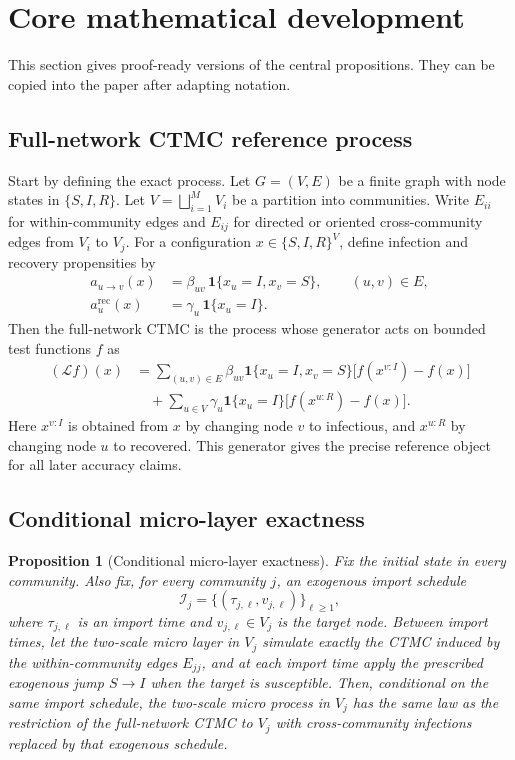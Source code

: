\documentclass[12pt,a4paper]{article}
\newtheorem{proposition}{Proposition}
\theoremstyle{definition}
\newcommand{\1}{\mathbf{1}}
\begin{document}
\section{Core mathematical development}

This section gives proof-ready versions of the central propositions.  They can be copied into the paper after adapting notation.

\subsection{Full-network CTMC reference process}

Start by defining the exact process.  Let $G=(V,E)$ be a finite graph with node states in $\{S,I,R\}$.  Let $V=\bigsqcup_{i=1}^M V_i$ be a partition into communities.  Write $E_{ii}$ for within-community edges and $E_{ij}$ for directed or oriented cross-community edges from $V_i$ to $V_j$.  For a configuration $x\in\{S,I,R\}^V$, define infection and recovery propensities by
\begin{align}
    a_{u\to v}(x) &= \beta_{uv}\,\1\{x_u=I,x_v=S\},\qquad (u,v)\in E,\\
    a_{u}^{\mathrm{rec}}(x) &= \gamma_u\,\1\{x_u=I\}.
\end{align}
Then the full-network CTMC is the process whose generator acts on bounded test functions $f$ as
\begin{align}
    (\mathcal L f)(x)
    &=\sum_{(u,v)\in E}\beta_{uv}\1\{x_u=I,x_v=S\}\bigl[f(x^{v:I})-f(x)\bigr] \\
    &\quad +\sum_{u\in V}\gamma_u\1\{x_u=I\}\bigl[f(x^{u:R})-f(x)\bigr].
\end{align}
Here $x^{v:I}$ is obtained from $x$ by changing node $v$ to infectious, and $x^{u:R}$ by changing node $u$ to recovered.  This generator gives the precise reference object for all later accuracy claims.

\subsection{Conditional micro-layer exactness}

\begin{proposition}[Conditional micro-layer exactness]
Fix the initial state in every community.  Also fix, for every community $j$, an exogenous import schedule
\begin{equation}
    \mathcal I_j=\{(\tau_{j,\ell},v_{j,\ell})\}_{\ell\ge 1},
\end{equation}
where $\tau_{j,\ell}$ is an import time and $v_{j,\ell}\in V_j$ is the target node.  Between import times, let the two-scale micro layer in $V_j$ simulate exactly the CTMC induced by the within-community edges $E_{jj}$, and at each import time apply the prescribed exogenous jump $S\to I$ when the target is susceptible.  Then, conditional on the same import schedule, the two-scale micro process in $V_j$ has the same law as the restriction of the full-network CTMC to $V_j$ with cross-community infections replaced by that exogenous schedule.
\end{proposition}
\end{document}
